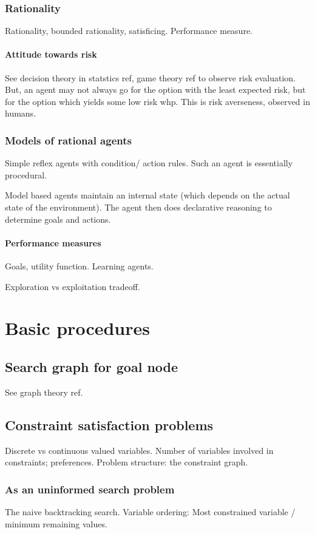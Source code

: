\documentclass[oneside, article]{memoir}
\begin{document}
\section{Rationality}
Rationality, bounded rationality, satisficing. Performance measure. \tbc

\subsection{Attitude towards risk}
See decision theory in statstics ref, game theory ref to observe risk evaluation. But, an agent may not always go for the option with the least expected risk, but for the option which yields some low risk whp. This is risk averseness, observed in humans.

\section{Models of rational agents}
Simple reflex agents with condition/ action rules. Such an agent is essentially procedural.

Model based agents maintain an internal state (which depends on the actual state of the environment). The agent then does declarative reasoning to determine goals and actions.

\subsection{Performance measures}
Goals, utility function. Learning agents.

Exploration vs exploitation tradeoff. \tbc

\part{Basic procedures}
\chapter{Search graph for goal node}
See graph theory ref.

\chapter{Constraint satisfaction problems}
Discrete vs continuous valued variables. Number of variables involved in constraints; preferences. Problem structure: the constraint graph.

\section{As an uninformed search problem}
The naive backtracking search. Variable ordering: Most constrained variable / minimum remaining values.
\end{document}
